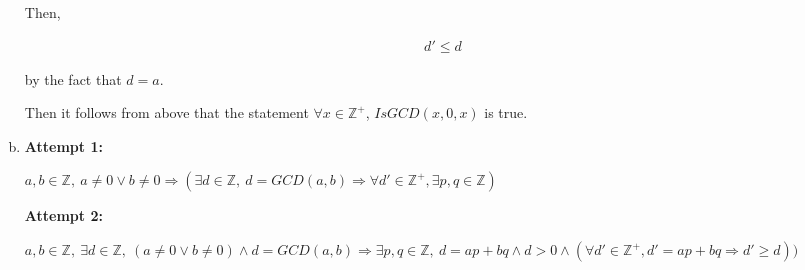 \documentclass[12pt]{article}
\begin{document}
\begin{enumerate}[a.]
    \bigskip

    Then,

    \begin{align}
        d' \leq d
    \end{align}

    by the fact that $d = a$.

    \bigskip

    Then it follows from above that the statement $\forall x \in \mathbb{Z}^{+}$,
    $IsGCD(x,0,x)$ is true.

    \item

    \textbf{Attempt 1:}

    $a,b \in \mathbb{Z},\:a \neq 0 \lor b \neq 0 \Rightarrow (\exists d \in \mathbb{Z},
    \:d=GCD(a,b) \Rightarrow \forall d' \in \mathbb{Z}^{+}, \exists p,q \in \mathbb{Z})$

    \textbf{Attempt 2:}

    $a,b \in \mathbb{Z},\:\exists d \in \mathbb{Z},\:(a \neq 0 \lor b \neq 0)
    \land d=GCD(a,b) \Rightarrow \exists p,q \in \mathbb{Z},\:d = ap + bq \land
    d > 0 \land (\forall d' \in \mathbb{Z}^{+}, d' = ap + bq \Rightarrow d' \geq d))$

\end{enumerate}
\end{document}
